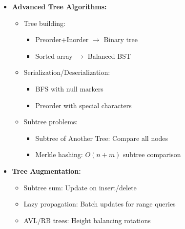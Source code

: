 \documentclass[a4paper,10pt]{book}
\begin{document}
\begin{itemize}
    \item \textbf{Advanced Tree Algorithms:}
    \begin{itemize}
        \item Tree building:
        \begin{itemize}
            \item Preorder+Inorder $\rightarrow$ Binary tree
            \item Sorted array $\rightarrow$ Balanced BST
        \end{itemize}
        \item Serialization/Deserialization:
        \begin{itemize}
            \item BFS with null markers
            \item Preorder with special characters
        \end{itemize}
        \item Subtree problems:
        \begin{itemize}
            \item Subtree of Another Tree: Compare all nodes
            \item Merkle hashing: $O(n+m)$ subtree comparison
        \end{itemize}
    \end{itemize}
    
    \item \textbf{Tree Augmentation:}
    \begin{itemize}
        \item Subtree sum: Update on insert/delete
        \item Lazy propagation: Batch updates for range queries
        \item AVL/RB trees: Height balancing rotations
    \end{itemize}
    

\end{itemize}
\end{document}
